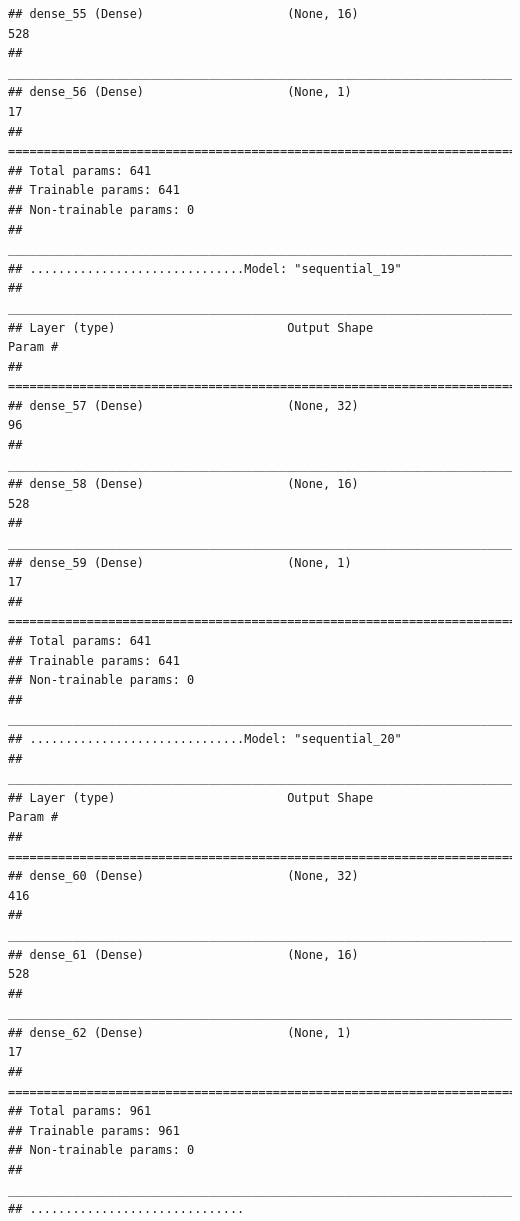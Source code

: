 \documentclass[
]{article}
\newenvironment{Shaded}{\begin{snugshade}}{\end{snugshade}}
\newcommand{\NormalTok}[1]{#1}
\newcommand{\OperatorTok}[1]{\textcolor[rgb]{0.81,0.36,0.00}{\textbf{#1}}}
\newcommand{\StringTok}[1]{\textcolor[rgb]{0.31,0.60,0.02}{#1}}
\begin{document}
\begin{verbatim}
## dense_55 (Dense)                    (None, 16)                      528         
## ________________________________________________________________________________
## dense_56 (Dense)                    (None, 1)                       17          
## ================================================================================
## Total params: 641
## Trainable params: 641
## Non-trainable params: 0
## ________________________________________________________________________________
## ..............................Model: "sequential_19"
## ________________________________________________________________________________
## Layer (type)                        Output Shape                    Param #     
## ================================================================================
## dense_57 (Dense)                    (None, 32)                      96          
## ________________________________________________________________________________
## dense_58 (Dense)                    (None, 16)                      528         
## ________________________________________________________________________________
## dense_59 (Dense)                    (None, 1)                       17          
## ================================================================================
## Total params: 641
## Trainable params: 641
## Non-trainable params: 0
## ________________________________________________________________________________
## ..............................Model: "sequential_20"
## ________________________________________________________________________________
## Layer (type)                        Output Shape                    Param #     
## ================================================================================
## dense_60 (Dense)                    (None, 32)                      416         
## ________________________________________________________________________________
## dense_61 (Dense)                    (None, 16)                      528         
## ________________________________________________________________________________
## dense_62 (Dense)                    (None, 1)                       17          
## ================================================================================
## Total params: 961
## Trainable params: 961
## Non-trainable params: 0
## ________________________________________________________________________________
## ..............................
\end{verbatim}

\begin{Shaded}
\end{Shaded}
\end{document}
